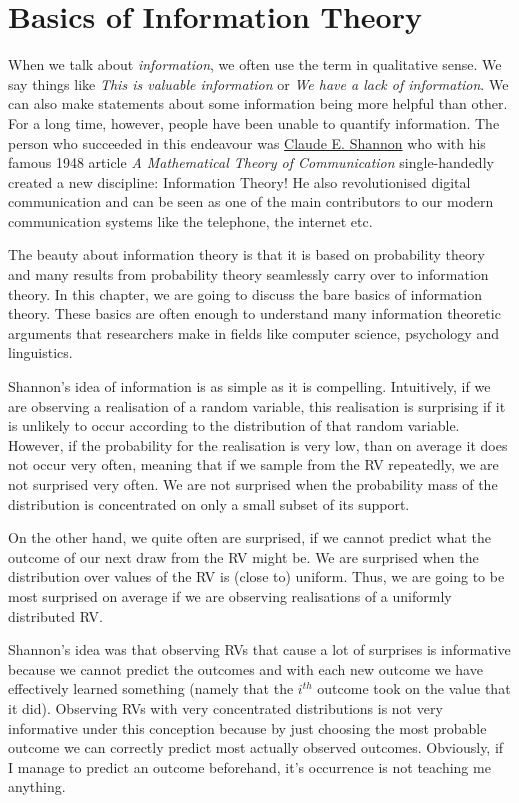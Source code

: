 \chapter{Basics of Information Theory}

When we talk about \textit{information}, we often use the term in qualitative sense. We say things like 
\textit{This is valuable information} or 
\textit{We have a lack of information}. We can also make statements about some information being more helpful than other. For a long time, however,
people have been unable to quantify information. The person who succeeded in this endeavour was \href{https://en.wikipedia.org/wiki/Claude_Shannon}{Claude E. Shannon}
who with his famous 1948 article \textit{A Mathematical Theory of Communication} single-handedly created a new discipline: Information Theory! He also revolutionised
digital communication and can be seen as one of the main contributors to our modern communication systems like the telephone, the internet etc. 

The beauty about information theory is that it is based on probability theory and many results from probability theory seamlessly carry over to information theory.
In this chapter, we are going to discuss the bare basics of information theory. These basics are often enough to understand many information theoretic arguments
that researchers make in fields like computer science, psychology and linguistics.

Shannon's idea of information is as simple as it is compelling. Intuitively, if we are observing a realisation of a random variable, this realisation is surprising
if it is unlikely to occur according to the distribution of that random variable. However, if the probability for the realisation is very low, than on average it
does not occur very often, meaning that if we sample from the RV repeatedly, we are not surprised very often. We are not surprised when the probability
mass of the distribution is concentrated on only a small subset of its support. 

On the other hand, we quite often are surprised,
if we cannot predict what the outcome of our next draw from the RV might be. We are surprised when the distribution over values of the RV is (close to) uniform. Thus,
we are going to be most surprised on average if we are observing realisations of a uniformly distributed RV.

Shannon's idea was that observing RVs that cause a lot of surprises is informative because we cannot predict the outcomes and with each new outcome we have effectively
learned something  (namely that the $ i^{th} $ outcome took on the value that it did). Observing RVs with very concentrated distributions is not very informative
under this conception because by just choosing the most probable outcome we can correctly predict most actually observed outcomes. Obviously, if I manage to predict
an outcome beforehand, it's occurrence is not teaching me anything.

